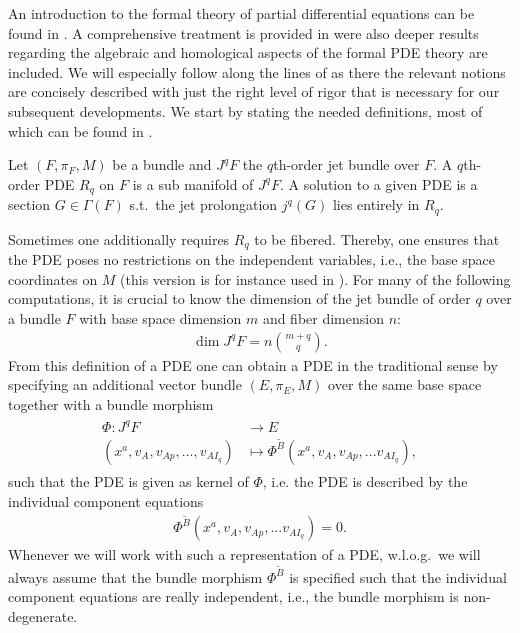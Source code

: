 An introduction to the formal theory of partial differential equations can be found in \cite{saunders_1989}. A comprehensive treatment is provided in \cite{seiler2009involution} were also deeper results regarding the algebraic and homological aspects of the formal PDE theory are included. We will especially follow along the lines of \cite{seiler1994analysis} as there the relevant notions are concisely described with just the right level of rigor that is necessary for our subsequent developments. We start by stating the needed definitions, most of which can be found in \cite{seiler1994analysis}.
\begin{definition}[PDE]
Let $(F,\pi_F,M)$ be a bundle and $J^qF$ the $q$th-order jet bundle over $F$. A $q$th-order PDE $R_q$ on $F$ is a  sub manifold of $J^qF$. A solution to a given PDE is a section $G \in \Gamma(F)$ s.t.\ the jet prolongation $j^q(G)$ lies entirely in $R_q$.  
\end{definition}
Sometimes one additionally requires $R_q$ to be fibered. Thereby, one ensures that the PDE poses no restrictions on the independent variables, i.e., the base space coordinates on $M$ (this version is for instance used in \cite{seiler1994analysis}).
For many of the following computations, it is crucial to know the dimension of the jet bundle of order $q$ over a bundle $F$ with base space dimension $m$ and fiber dimension $n$:
\begin{align}
    \operatorname{dim}J^qF = n\binom{m+q}{q}.
\end{align}
From this definition of a PDE one can obtain a PDE in the traditional sense by specifying an additional vector bundle $(E,\pi_E,M)$ over the same base space together with a bundle morphism
\begin{align}
    \begin{aligned}
    \Phi : J^qF &\longrightarrow E\\
    (x^a, v_A, v_{Ap},...,v_{AI_q}) &\longmapsto \Phi^{\tilde{B}}(x^a, v_A, v_{Ap},...v_{AI_q}),
    \end{aligned}
\end{align}
such that the PDE is given as kernel of $\Phi$, i.e.
the PDE is described by the individual component  equations
\begin{align}
    \Phi^{\tilde{B}}(x^a, v_A, v_{Ap},...v_{AI_q}) = 0.
\end{align}
Whenever we will work with such a representation of a PDE, w.l.o.g.\ we will always assume that the bundle morphism $\Phi^{\tilde{B}}$ is specified such that the individual component equations are really independent, i.e., the bundle morphism is non-degenerate. 

